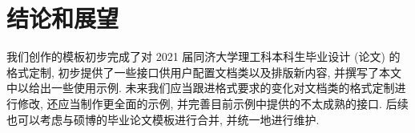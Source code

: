 
\section{结论和展望}

我们创作的模板初步完成了对 2021 届同济大学理工科本科生毕业设计 (论文) 的格式定制, 初步提供了一些接口供用户配置文档类以及排版新内容, 并撰写了本文中以给出一些使用示例. 未来我们应当跟进格式要求的变化对文档类的格式定制进行修改, 还应当制作更全面的示例, 并完善目前示例中提供的不太成熟的接口. 后续也可以考虑与硕博的毕业论文模板进行合并, 并统一地进行维护.
